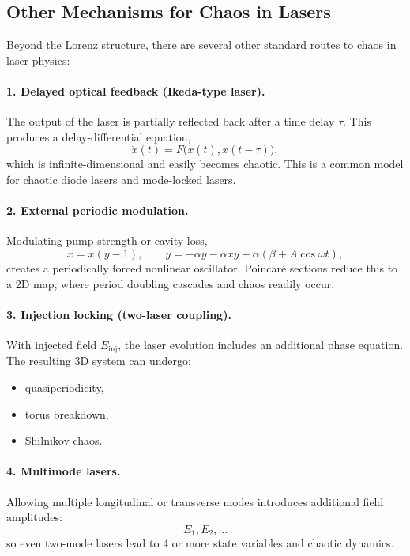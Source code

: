 \documentclass[11pt]{amsart}
\begin{document}
\subsection{Other Mechanisms for Chaos in Lasers}

Beyond the Lorenz structure, there are several other standard routes to chaos
in laser physics:

\paragraph{1. Delayed optical feedback (Ikeda-type laser).}
The output of the laser is partially reflected back after a time delay $\tau$.
This produces a delay-differential equation,
\[
\dot x(t) = F\big(x(t), x(t-\tau)\big),
\]
which is infinite-dimensional and easily becomes chaotic.  
This is a common model for chaotic diode lasers and mode-locked lasers.

\paragraph{2. External periodic modulation.}
Modulating pump strength or cavity loss,
\[
\dot x = x(y-1), \qquad \dot y = -\alpha y - \alpha x y + \alpha (\beta + A\cos\omega t),
\]
creates a periodically forced nonlinear oscillator.  
Poincaré sections reduce this to a 2D map, where period doubling cascades and
chaos readily occur.

\paragraph{3. Injection locking (two-laser coupling).}
With injected field $E_\text{inj}$, the laser evolution includes an additional
phase equation.  The resulting 3D system can undergo:
\begin{itemize}
\item quasiperiodicity,
\item torus breakdown,
\item Shilnikov chaos.
\end{itemize}

\paragraph{4. Multimode lasers.}
Allowing multiple longitudinal or transverse modes introduces additional field
amplitudes:
\[
E_1, E_2, \dots
\]
so even two-mode lasers lead to 4 or more state variables and chaotic dynamics.
\end{document}
